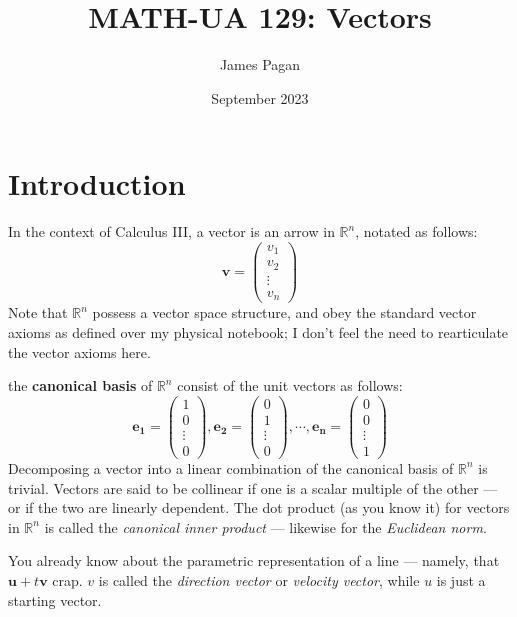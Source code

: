 \documentclass[11pt]{article}
\title{MATH-UA 129: Vectors}
\author{James Pagan}
\date{September 2023}
\begin{document}
\maketitle
\tableofcontents


\section{Introduction}

In the context of Calculus III, a vector is an arrow in $\mathbb{R}^{n}$, notated as follows:
\[ \mathbf{v} = \begin{pmatrix} v_{1} \\ v_{2} \\ \vdots \\ v_{n} \end{pmatrix} \]
Note that $\mathbb{R}^{n}$ possess a vector space structure, and obey the standard vector axioms as defined over my physical notebook; I don't feel the need to rearticulate the vector axioms here.

the \textbf{canonical basis} of $\mathbb{R}^n$ consist of the unit vectors as follows:
\[ \mathbf{e_{1}} = \begin{pmatrix} 1 \\ 0 \\ \vdots \\ 0 \end{pmatrix}, \mathbf{e_{2}} = \begin{pmatrix} 0 \\ 1 \\ \vdots \\ 0 \end{pmatrix}, \cdots, \mathbf{e_{n}} = \begin{pmatrix} 0 \\ 0 \\ \vdots \\ 1 \end{pmatrix} \]
Decomposing a vector into a linear combination of the canonical basis of $\mathbb{R}^{n}$ is trivial. Vectors are said to be collinear if one is a scalar multiple of the other --- or if the two are linearly dependent. The dot product (as you know it) for vectors in $\mathbb{R}^{n}$ is called the \textit{canonical inner product} --- likewise for the \textit{Euclidean norm}.

You already know about the parametric representation of a line --- namely, that $\mathbf{u} + t \mathbf{v}$ crap. $v$ is called the \textit{direction vector} or \textit{velocity vector}, while $u$ is just a starting vector.
\end{document}
